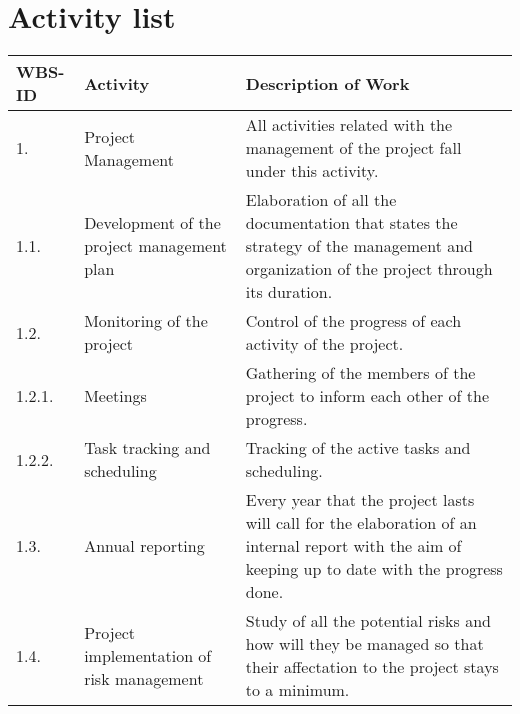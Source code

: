 \section{Activity list}

\begin{longtable}[H]{l >{\raggedright\arraybackslash}p{4cm} p{8cm}}
	
	\toprule[2pt]
	
	\textbf{WBS-ID} &  \textbf{Activity}  & \textbf{Description of Work} \\
	
	\midrule [1.5pt]
	\endhead
	
	1. & Project Management & All activities related with the management of the project fall under this activity.\vspace{0.2cm} \\
	
	\midrule
	
	1.1. & Development of the project management plan &Elaboration of all the documentation that states the strategy of the management and organization of the project through its duration.\vspace{0.2cm} \\
	
	\midrule
	
	1.2. & Monitoring of the project & Control of the progress of each activity of the project.\vspace{0.2cm} \\
	
	\midrule
	
	1.2.1. & Meetings & Gathering of the members of the project to inform each other of the progress.\vspace{0.2cm} \\
	
	\midrule
	
	1.2.2. & Task tracking and scheduling & Tracking of the active tasks and scheduling.\vspace{0.2cm} \\
	
	\midrule
	
	1.3. & Annual reporting & Every year that the project lasts will call for the elaboration of an internal report with the aim of keeping up to date with the progress done.\vspace{0.2cm} \\
	
	\midrule
	
	1.4. & Project implementation of risk management & Study of all the potential risks and how will they be managed so that their affectation to the project stays to a minimum.\vspace{0.2cm} \\
	

\end{longtable}
